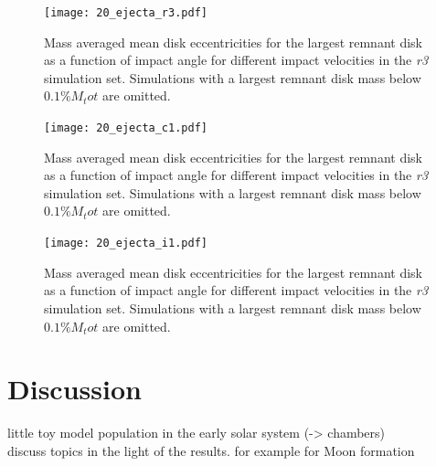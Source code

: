 \begin{landscape}
\begin{figure}
\begin{center}
\texttt{[image: 20\_ejecta\_r3.pdf]}
\caption{Mass averaged mean disk eccentricities for the largest remnant disk as a function of impact angle for different impact velocities in the \emph{r3} simulation set. Simulations with a largest remnant disk mass below $0.1\% M_tot$ are omitted.}
\label{ch03_fig20a}
\end{center}
\end{figure}

\begin{figure}
\begin{center}
\texttt{[image: 20\_ejecta\_c1.pdf]}
\caption{Mass averaged mean disk eccentricities for the largest remnant disk as a function of impact angle for different impact velocities in the \emph{r3} simulation set. Simulations with a largest remnant disk mass below $0.1\% M_tot$ are omitted.}
\label{ch03_fig20b}
\end{center}
\end{figure}

\begin{figure}
\begin{center}
\texttt{[image: 20\_ejecta\_i1.pdf]}
\caption{Mass averaged mean disk eccentricities for the largest remnant disk as a function of impact angle for different impact velocities in the \emph{r3} simulation set. Simulations with a largest remnant disk mass below $0.1\% M_tot$ are omitted.}
\label{ch03_fig20c}
\end{center}
\end{figure}
\end{landscape}



\section{Discussion}
little toy model population in the early solar system (-> chambers) \\

discuss topics in the light of the results. for example for Moon formation


